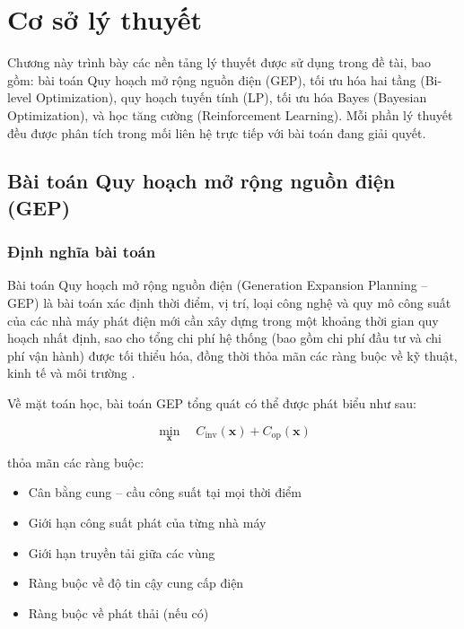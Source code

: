 \chapter{Cơ sở lý thuyết}

Chương này trình bày các nền tảng lý thuyết được sử dụng trong đề tài, bao gồm: bài toán Quy hoạch mở rộng nguồn điện (GEP), tối ưu hóa hai tầng (Bi-level Optimization), quy hoạch tuyến tính (LP), tối ưu hóa Bayes (Bayesian Optimization), và học tăng cường (Reinforcement Learning). Mỗi phần lý thuyết đều được phân tích trong mối liên hệ trực tiếp với bài toán đang giải quyết.

\section{Bài toán Quy hoạch mở rộng nguồn điện (GEP)}

\subsection{Định nghĩa bài toán}

Bài toán Quy hoạch mở rộng nguồn điện (Generation Expansion Planning -- GEP) là bài toán xác định thời điểm, vị trí, loại công nghệ và quy mô công suất của các nhà máy phát điện mới cần xây dựng trong một khoảng thời gian quy hoạch nhất định, sao cho tổng chi phí hệ thống (bao gồm chi phí đầu tư và chi phí vận hành) được tối thiểu hóa, đồng thời thỏa mãn các ràng buộc về kỹ thuật, kinh tế và môi trường \cite{koltsaklis2018gep}.

Về mặt toán học, bài toán GEP tổng quát có thể được phát biểu như sau:

\begin{equation}
    \min_{\mathbf{x}} \quad C_{\text{inv}}(\mathbf{x}) + C_{\text{op}}(\mathbf{x})
    \label{eq:gep_general}
\end{equation}

\noindent thỏa mãn các ràng buộc:
\begin{itemize}
    \item Cân bằng cung -- cầu công suất tại mọi thời điểm
    \item Giới hạn công suất phát của từng nhà máy
    \item Giới hạn truyền tải giữa các vùng
    \item Ràng buộc về độ tin cậy cung cấp điện
    \item Ràng buộc về phát thải (nếu có)
\end{itemize}

